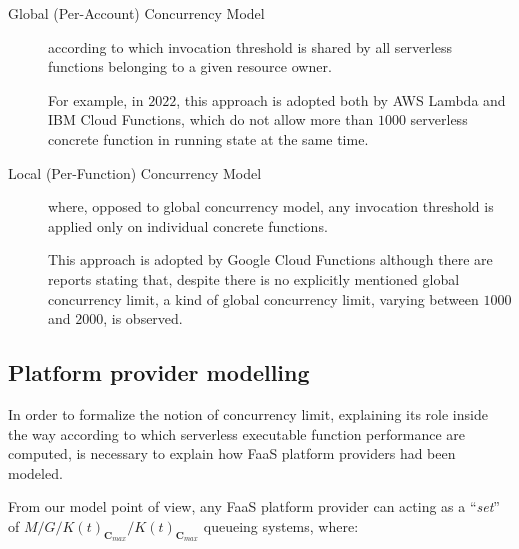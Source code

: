 \documentclass[10pt,a4paper]{report}
\theoremstyle{definition}
\begin{document}
\begin{description}
	\item[Global (Per-Account) Concurrency Model] according to which invocation threshold is shared by all serverless functions belonging to a given resource owner. 
	
	For example, in $2022$, this approach is adopted both by AWS Lambda and IBM Cloud Functions, which do not allow more than $1000$ serverless concrete function in running state at the same time.
	
	\item[Local (Per-Function) Concurrency Model] where, opposed to global concurrency model, any invocation threshold is applied only on individual concrete functions. 
	
	This approach is adopted by Google Cloud Functions although there are reports stating that, despite there is no explicitly mentioned global concurrency limit, a kind of global concurrency limit, varying between $1000$ and $2000$, is observed.
	
\end{description}

\subsection{Platform provider modelling}

In order to formalize the notion of concurrency limit, explaining its role inside the way according to which serverless executable function performance are computed, is necessary to explain how FaaS platform providers had been modeled.

From our model point of view, any FaaS platform provider can acting as a ``\textit{set}'' of $M/G/K(t)_{\textbf{C}_{max}}/K(t)_{\textbf{C}_{max}}$ queueing systems, where:
\end{document}
